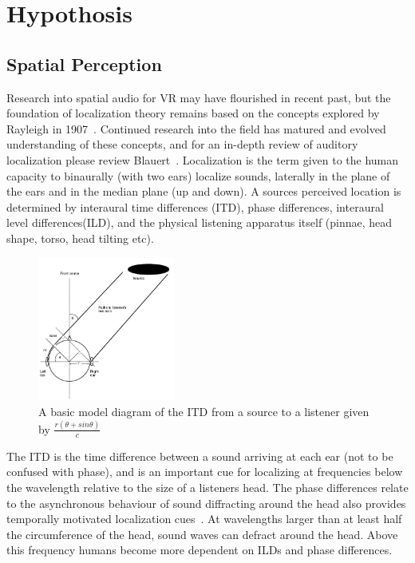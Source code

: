 \documentclass[paper=a4, fontsize=10pt, font=arial]{scrartcl} %
\numberwithin{equation}{section} %
\numberwithin{figure}{section} %
\numberwithin{table}{section} %
\begin{document}

\newpage

\section{Hypothosis}
\subsection{Spatial Perception}

Research into spatial audio for VR may have flourished in recent past, but the foundation of localization theory remains based on the concepts explored by Rayleigh in 1907~\cite{Blauert1997}. Continued research into the field has matured and evolved understanding of these concepts, and for an in-depth review of auditory localization please review Blauert~\cite{Blauert1997}. Localization is the term given to the human capacity to binaurally (with two ears) localize sounds, laterally in the plane of the ears and in the median plane (up and down). A sources perceived location is determined by interaural time differences (ITD), phase differences, interaural level differences(ILD), and the physical listening apparatus itself (pinnae, head shape, torso, head tilting etc).

\begin{figure}[H]
\centering
\includegraphics[width=0.4\textwidth]{itdexample.jpg}
\centering
\caption{A basic model diagram of the ITD from a source to a listener given by $\frac{r(\theta + sin \theta)}{\textit{c}}$ ~\cite{rumsey2012spatial}}
\end{figure} 

The ITD is the time difference between a sound arriving at each ear (not to be confused with phase), and is an important cue for localizing at frequencies below the wavelength relative to the size of a listeners head. The phase differences relate to the asynchronous behaviour of sound diffracting around the head also provides temporally motivated localization cues~\cite{Aaronson2014}. At wavelengths larger than at least half the circumference of the head, sound waves can defract around the head. Above this frequency humans become more dependent on ILDs and phase differences. 
\end{document}
